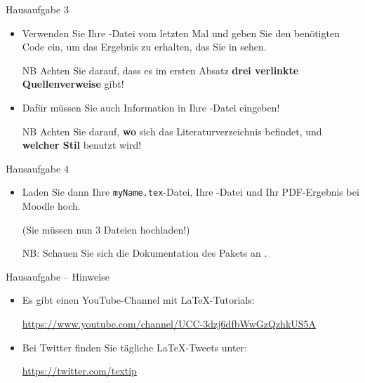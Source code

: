 \begin{frame}{Hausaufgabe 3}

\begin{itemize}
	
	\item Verwenden Sie Ihre -Datei vom letzten Mal und geben Sie den benötigten Code ein, um das Ergebnis zu erhalten, das Sie in  sehen.
	
	\item[NB] Achten Sie darauf, dass es im ersten Absatz \textbf{drei verlinkte Quellenverweise} gibt!
	
	\item Dafür müssen Sie auch Information in Ihre -Datei eingeben!
	
	\item[NB] Achten Sie darauf, \textbf{wo} sich das Literaturverzeichnis befindet, und \textbf{welcher Stil} benutzt wird! 
\end{itemize}
\end{frame}


\begin{frame}{Hausaufgabe 4}

\begin{itemize}
		
	\item Laden Sie dann Ihre \texttt{myName.tex}-Datei, Ihre -Datei und Ihr PDF-Ergebnis bei Moodle hoch. 
	
	(Sie müssen nun 3 Dateien hochladen!)
	
	\item[NB:] Schauen Sie sich die Dokumentation des Pakets  an \citep{Daly10a}.
	
\end{itemize}

\end{frame}


\begin{frame}{Hausaufgabe -- Hinweise}

\begin{itemize}
	
	\item Es gibt einen YouTube-Channel mit \LaTeX -Tutorials:
	
	\url{https://www.youtube.com/channel/UCC-3dzj6dfbWwGzQzhkUS5A}
	
	\item Bei Twitter finden Sie tägliche \LaTeX -Tweets unter:
	
	\url{https://twitter.com/textip}
	
\end{itemize}

\end{frame}


